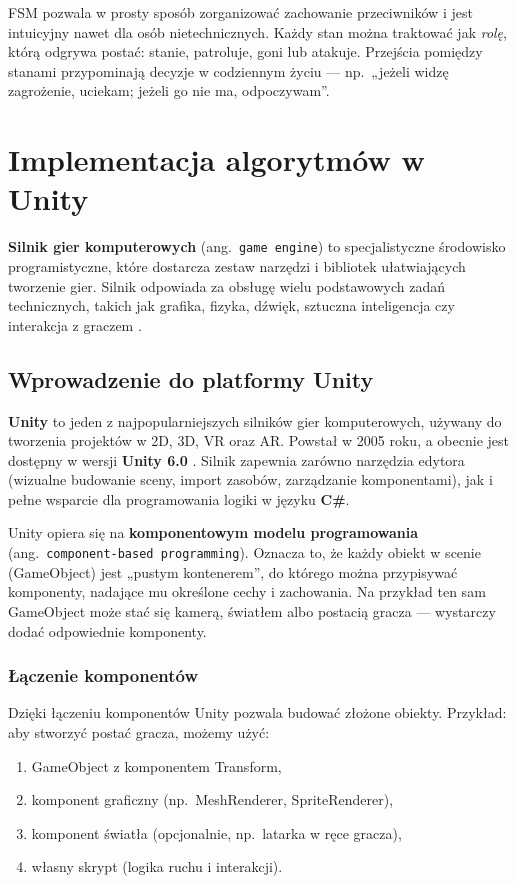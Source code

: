 \documentclass[a4paper,12pt]{book} %
\begin{document}
FSM pozwala w prosty sposób zorganizować zachowanie przeciwników 
i jest intuicyjny nawet dla osób nietechnicznych. 
Każdy stan można traktować jak \textit{rolę}, którą odgrywa postać: 
stanie, patroluje, goni lub atakuje. 
Przejścia pomiędzy stanami przypominają decyzje w codziennym życiu 
— np.\ „jeżeli widzę zagrożenie, uciekam; jeżeli go nie ma, odpoczywam”.

\chapter{Implementacja algorytmów w Unity}

\textbf{Silnik gier komputerowych} (ang.\ \texttt{game engine}) to specjalistyczne środowisko programistyczne, 
które dostarcza zestaw narzędzi i bibliotek ułatwiających tworzenie gier. 
Silnik odpowiada za obsługę wielu podstawowych zadań technicznych, 
takich jak grafika, fizyka, dźwięk, sztuczna inteligencja czy interakcja z graczem \cite{GameEngines}.
\section{Wprowadzenie do platformy Unity}

\textbf{Unity} to jeden z najpopularniejszych silników gier komputerowych, 
używany do tworzenia projektów w 2D, 3D, VR oraz AR. 
Powstał w 2005 roku, a obecnie jest dostępny w wersji \textbf{Unity 6.0} \cite{Unity_Manual}. 
Silnik zapewnia zarówno narzędzia edytora (wizualne budowanie sceny, import zasobów, zarządzanie komponentami), 
jak i pełne wsparcie dla programowania logiki w języku \textbf{C\#}.  

Unity opiera się na \textbf{komponentowym modelu programowania} (ang.\ \texttt{component-based programming}). 
Oznacza to, że każdy obiekt w scenie (GameObject) 
jest „pustym kontenerem”, do którego można przypisywać komponenty, nadające mu określone cechy i zachowania. 
Na przykład ten sam GameObject może stać się kamerą, światłem albo postacią gracza --- 
wystarczy dodać odpowiednie komponenty.  

\subsection{Łączenie komponentów}

Dzięki łączeniu komponentów Unity pozwala budować złożone obiekty.  
Przykład: aby stworzyć postać gracza, możemy użyć:
\begin{enumerate}
  \item GameObject z komponentem Transform,
  \item komponent graficzny (np.\ MeshRenderer, SpriteRenderer),
  \item komponent światła (opcjonalnie, np.\ latarka w ręce gracza),
  \item własny skrypt (logika ruchu i interakcji).
\end{enumerate}
\end{document}
